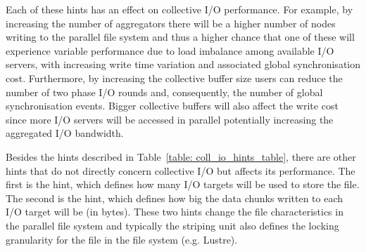 Each of these hints has an effect on collective I/O performance. For example, by increasing the number of aggregators there will be a higher number of nodes writing to the parallel file system and thus a higher chance that one of these will experience variable performance due to load imbalance among available I/O servers, with increasing write time variation and associated global synchronisation cost. Furthermore, by increasing the collective buffer size users can reduce the number of two phase I/O rounds and, consequently, the number of global synchronisation events. Bigger collective buffers will also affect the write cost since more I/O servers will be accessed in parallel potentially increasing the aggregated I/O bandwidth.

Besides the hints described in Table~\ref{table: coll_io_hints_table}, there are other hints that do not directly concern collective I/O but affects its performance. The first is the  hint, which defines how many I/O targets will be used to store the file. The second is the  hint, which defines how big the data chunks written to each I/O target will be (in bytes). These two hints change the file characteristics in the parallel file system and typically the striping unit also defines the locking granularity for the file in the file system (e.g. Lustre).
